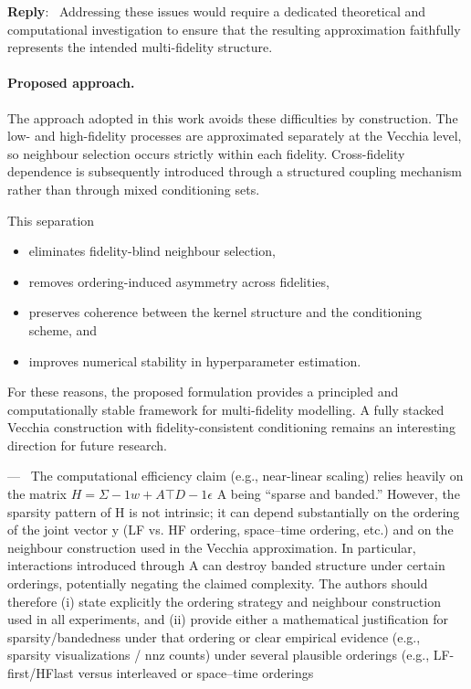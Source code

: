 \documentclass[12pt]{article}
\newcommand{\0}{\mathbf{0}}
\newcounter{reviewer}
\newcounter{point}[reviewer]
\renewcommand{\thepoint}{P\,\thereviewer.\arabic{point}}
\newenvironment{point}
   {\refstepcounter{point} \bigskip \noindent {\textbf{Point~\thepoint} } ---\ }
   {\par }
\newenvironment{reply}
   {\medskip \noindent \begin{sf}\color{Blue}\textbf{Reply}:\  }
   {\medskip \end{sf}}
\begin{document}
\begin{reply}
Addressing these issues would require a dedicated theoretical and computational investigation to ensure that the resulting approximation faithfully represents the intended multi-fidelity structure.

\paragraph{Proposed approach.}
The approach adopted in this work avoids these difficulties by construction. The low- and high-fidelity processes are approximated separately at the Vecchia level, so neighbour selection occurs strictly within each fidelity. Cross-fidelity dependence is subsequently introduced through a structured coupling mechanism rather than through mixed conditioning sets.

This separation
\begin{itemize}
\item eliminates fidelity-blind neighbour selection,
\item removes ordering-induced asymmetry across fidelities,
\item preserves coherence between the kernel structure and the conditioning scheme, and
\item improves numerical stability in hyperparameter estimation.
\end{itemize}

For these reasons, the proposed formulation provides a principled and computationally stable framework for multi-fidelity modelling. A fully stacked Vecchia construction with fidelity-consistent conditioning remains an interesting direction for future research.
\end{reply}


\begin{point}
The computational efficiency claim (e.g., near-linear scaling) relies heavily
on the matrix $H = Σ−1
w +A⊤D−1 ϵ$ A being “sparse and banded.” However,
the sparsity pattern of H is not intrinsic; it can depend substantially
on the ordering of the joint vector y (LF vs. HF ordering, space–time
ordering, etc.) and on the neighbour construction used in the Vecchia
approximation. In particular, interactions introduced through A can destroy
banded structure under certain orderings, potentially negating the
claimed complexity. The authors should therefore (i) state explicitly the
ordering strategy and neighbour construction used in all experiments, and
(ii) provide either a mathematical justification for sparsity/bandedness
under that ordering or clear empirical evidence (e.g., sparsity visualizations
/ nnz counts) under several plausible orderings (e.g., LF-first/HFlast
versus interleaved or space–time orderings
   
\end{point}
\end{document}
